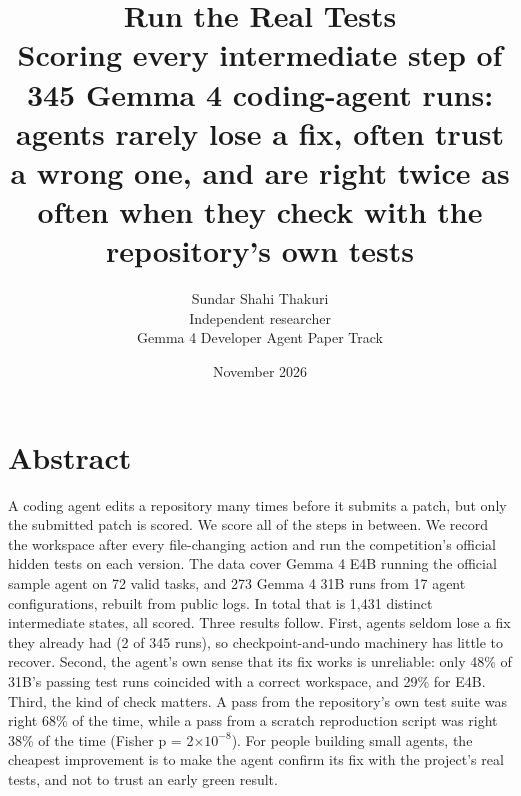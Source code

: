 \documentclass[10pt]{article}
\title{Run the Real Tests\\[4pt]\large Scoring every intermediate step of 345 Gemma 4 coding-agent runs: agents rarely lose a fix, often trust a wrong one, and are right twice as often when they check with the repository's own tests}
\author{Sundar Shahi Thakuri\\ Independent researcher\\ \small Gemma 4 Developer Agent Paper Track}
\date{November 2026}
\begin{document}
\maketitle
\begin{center}\end{center}
\section*{Abstract}
A coding agent edits a repository many times before it submits a patch, but only the submitted patch is scored. We score all of the steps in between. We record the workspace after every file-changing action and run the competition's official hidden tests on each version. The data cover Gemma 4 E4B running the official sample agent on 72 valid tasks, and 273 Gemma 4 31B runs from 17 agent configurations, rebuilt from public logs. In total that is 1,431 distinct intermediate states, all scored. Three results follow. First, agents seldom lose a fix they already had (2 of 345 runs), so checkpoint-and-undo machinery has little to recover. Second, the agent's own sense that its fix works is unreliable: only 48\% of 31B's passing test runs coincided with a correct workspace, and 29\% for E4B. Third, the kind of check matters. A pass from the repository's own test suite was right 68\% of the time, while a pass from a scratch reproduction script was right 38\% of the time (Fisher p = 2$\times 10^{-8}$). For people building small agents, the cheapest improvement is to make the agent confirm its fix with the project's real tests, and not to trust an early green result.
\end{document}
